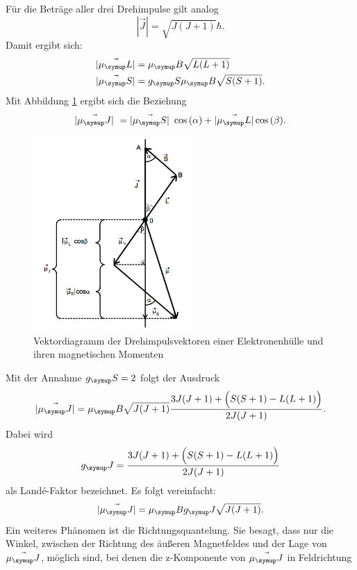 Für die Beträge aller drei Drehimpulse gilt analog
\begin{equation}
  |\vec{J}| = \sqrt{J(J+1)} \hbar.
\end{equation}
Damit ergibt sich:
\begin{align}
  |\vec{\mu_\su{L}}| &= \mu_\su{B}\sqrt{L(L+1)} \\
  |\vec{\mu_\su{S}}| &= g_\su{S}\mu_\su{B}\sqrt{S(S+1)}.
\end{align}
Mit Abbildung \ref{fig:drehimpuls} ergibt sich die Beziehung
\begin{equation}
  |\vec{\mu_\su{J}}| = |\vec{\mu_\su{S}}| \cos{(\alpha)} + |\vec{\mu_\su{L}}|
  \cos{(\beta)}.
\end{equation}
\begin{figure}
  \centering
  \includegraphics[width=6cm]{bilder/drehimpuls.png}
  \caption{Vektordiagramm der Drehimpulsvektoren einer Elektronenhülle und ihren
  magnetischen Momenten \cite{606}}
  \label{fig:drehimpuls}
\end{figure}
Mit der Annahme $g_\su{S} = 2$ folgt der Ausdruck
\begin{equation}
  |\vec{\mu_\su{J}}| = \mu_\su{B} \sqrt{J(J+1)} \frac{3J(J+1)+\Big(S(S+1)
  -L(L+1)\Big)}{2J(J+1)}.
\end{equation}
Dabei wird
\begin{equation}
  g_\su{J} = \frac{3J(J+1)+\Big(S(S+1) -L(L+1)\Big)}{2J(J+1)}
\end{equation}
als Landé-Faktor bezeichnet.
Es folgt vereinfacht:
\begin{equation}
  |\vec{\mu_\su{J}}| = \mu_\su{B} g_\su{J} \sqrt{J(J+1)}.
\end{equation}
Ein weiteres Phänomen ist die Richtungsquantelung. Sie besagt, dass nur die Winkel,
zwischen der Richtung des äußeren Magnetfeldes und der Lage von $\vec{\mu_\su{J}}$,
möglich sind, bei denen die z-Komponente von $\vec{\mu_\su{J}}$ in Feldrichtung
